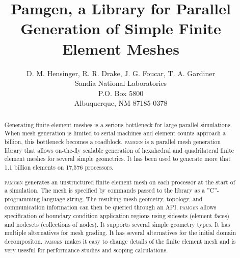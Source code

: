 \documentclass[12pt,twoside]{article}
\begin{document}
    

    \newcommand{\thetitle}{Pamgen, a Library for Parallel Generation of Simple Finite Element Meshes}
    \title{\thetitle}
    
    \newcommand{\theauthor}{ D. M. Hensinger, R. R. Drake, J. G. Foucar, T. A. Gardiner
       \\
       Sandia National Laboratories\\
       P.O. Box 5800\\
       Albuquerque, NM 87185-0378\\
    }
    \author{\theauthor}

    


    
    \begin{abstract}
Generating finite-element meshes is a serious bottleneck for
large parallel simulations. When mesh generation is limited to serial
machines and element counts approach a billion, this bottleneck becomes
a roadblock.  \textsc{pamgen} is a parallel mesh generation
library that allows on{}-the{}-fly scalable generation of hexahedral and quadrilateral finite
element meshes for several simple geometries. It has been used to
generate more that 1.1 billion elements on 17,576 processors. 

\textsc{pamgen} generates an unstructured finite element mesh on each processor at the start
of a simulation. The mesh is specified by commands passed to the library as a {}''C{}''-programming language string.  The resulting mesh geometry, topology, and communication information can then be queried through an API. \textsc{pamgen} allows specification of boundary condition application regions using 
sidesets (element faces) and nodesets (collections of nodes). It supports several simple geometry types. It has multiple alternatives
for mesh grading. It has several alternatives for the initial domain decompositon. \textsc{pamgen} makes it easy to change details of the finite element mesh and is very usesful for performance studies and scoping calculations.
    \end{abstract}
\end{document}
